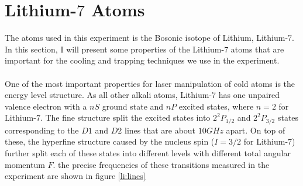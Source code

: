 \section{Lithium-$7$ Atoms}

The atoms used in this experiment is the Bosonic isotope of Lithium, Lithium-$7$. In this section, I will present some properties of the Lithium-$7$ atoms that are important for the cooling and trapping techniques we use in the experiment.\\
\\
One of the most important properties for laser manipulation of cold atoms is the energy level structure. As all other alkali atoms, Lithium-$7$ has one unpaired valence electron with a $nS$ ground state and $nP$ excited states, where $n=2$ for Lithium-$7$. The fine structure split the excited states into $2^2P_{1/2}$ and $2^2P_{3/2}$ states corresponding to the $D1$ and $D2$ lines that are about $10GHz$ apart. On top of these, the hyperfine structure caused by the nucleus spin ($I=3/2$ for Lithium-$7$) further split each of these states into different levels with different total angular momentum $F$. the precise frequencies of these transitions measured in the experiment are shown in figure \ref{li:lines}\\
